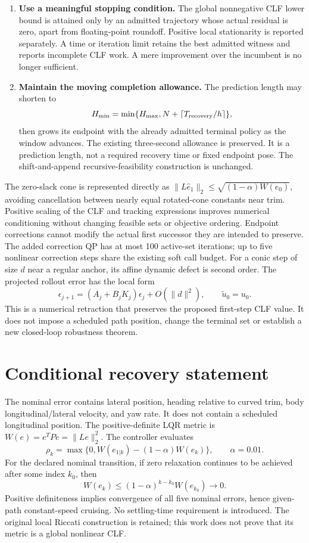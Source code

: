 \documentclass[11pt]{article}
\begin{document}
\begin{enumerate}
The resulting trajectory is a search candidate and must pass the same
complete nonlinear admission.
\item \textbf{Use a meaningful stopping condition.} The global
nonnegative CLF lower bound is attained only by an admitted trajectory
whose actual residual is zero, apart from floating-point roundoff.
Positive local stationarity is reported separately. A time or iteration
limit retains the best admitted witness and reports incomplete CLF work.
A mere improvement over the incumbent is no longer sufficient.
\item \textbf{Maintain the moving completion allowance.} The prediction
length may shorten to
\[
H_{\min}=\min\{H_{\max},N+\lceil T_{\rm recovery}/h\rceil\},
\]
then grows its endpoint with the already admitted terminal policy as the
window advances. The existing three-second allowance is preserved. It is
a prediction length, not a required recovery time or fixed endpoint pose.
The shift-and-append recursive-feasibility construction is unchanged.
\end{enumerate}

The zero-slack cone is represented directly as
\(\|L\widehat e_1\|_2\le\sqrt{(1-\alpha)W(e_0)}\), avoiding cancellation
between nearly equal rotated-cone constants near trim. Positive scaling
of the CLF and tracking expressions improves numerical conditioning
without changing feasible sets or objective ordering. Endpoint corrections
cannot modify the actual first successor they are intended to preserve.
The added correction QP has at most 100 active-set iterations; up to five
nonlinear correction steps share the existing soft call budget.
For a conic step of size $d$ near a regular anchor, its affine dynamic
defect is second order. The projected rollout error has the local form
\[
\epsilon_{j+1}=(A_j+B_jK_j)\epsilon_j+O(\|d\|^2),
\qquad \widetilde u_0=u_0.
\]
This is a numerical retraction that preserves the proposed first-step
CLF value. It does not impose a scheduled path position, change the
terminal set or establish a new closed-loop robustness theorem.

\section{Conditional recovery statement}
The nominal error contains lateral position, heading relative to curved
trim, body longitudinal/lateral velocity, and yaw rate. It does not contain
a scheduled longitudinal position. The positive-definite LQR metric is
\(W(e)=e^TPe=\|Le\|_2^2\). The controller evaluates
\[
\rho_k=\max\{0,W(e_{1|k})-(1-\alpha)W(e_k)\},\qquad\alpha=0.01.
\]
For the declared nominal transition, if zero relaxation continues to be
achieved after some index $k_0$, then
\[
W(e_k)\le(1-\alpha)^{k-k_0}W(e_{k_0})\longrightarrow0.
\]
Positive definiteness implies convergence of all five nominal errors,
hence given-path constant-speed cruising. No settling-time requirement is
introduced. The original local Riccati construction is retained; this
work does not prove that its metric is a global nonlinear CLF.
\end{document}
